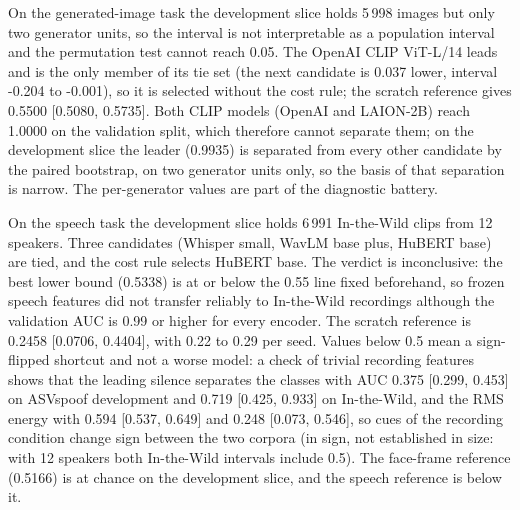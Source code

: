 \documentclass[conference,a4paper]{IEEEtran_nodash}
\begin{document}
On the generated-image task the development slice holds 5\,998 images but only
two generator units, so the interval is not interpretable as a population
interval and the permutation test cannot reach 0.05. The OpenAI CLIP
ViT-L/14 leads and is the only member of its tie set (the next candidate is
0.037 lower, interval -0.204 to -0.001), so it is selected without the cost
rule; the scratch reference gives 0.5500 [0.5080, 0.5735]. Both CLIP models
(OpenAI and LAION-2B) reach 1.0000 on the validation split, which therefore
cannot separate them; on the development slice the leader (0.9935) is
separated from every other candidate by the paired bootstrap, on two generator
units only, so the basis of that separation is narrow. The per-generator
values are part of the diagnostic battery.

On the speech task the development slice holds 6\,991 In-the-Wild clips from 12
speakers. Three candidates (Whisper small, WavLM base plus, HuBERT base) are
tied, and the cost rule selects HuBERT base. The verdict is inconclusive: the
best lower bound (0.5338) is at or below the 0.55 line fixed beforehand, so
frozen speech features did not transfer reliably to In-the-Wild recordings
although the validation AUC is 0.99 or higher for every encoder. The scratch
reference is 0.2458 [0.0706, 0.4404], with 0.22 to 0.29 per seed. Values below
0.5 mean a sign-flipped shortcut and not a worse model: a check of trivial
recording features shows that the leading silence separates the classes with
AUC 0.375 [0.299, 0.453] on ASVspoof development and 0.719 [0.425, 0.933] on
In-the-Wild, and the RMS energy with 0.594 [0.537, 0.649] and 0.248
[0.073, 0.546], so cues of the recording condition change sign between the two
corpora (in sign, not established in size: with 12 speakers both In-the-Wild
intervals include 0.5). The face-frame reference (0.5166) is at chance on the
development slice, and the speech reference is below it.
\end{document}
